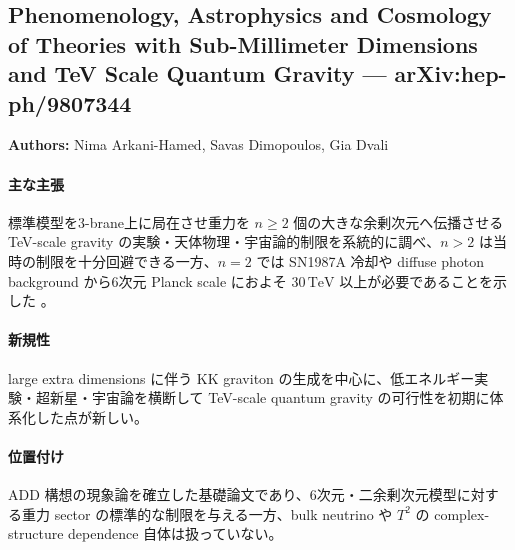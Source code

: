 \subsection{Phenomenology, Astrophysics and Cosmology of Theories with Sub-Millimeter Dimensions and TeV Scale Quantum Gravity --- arXiv:hep-ph/9807344}

\textbf{Authors:} Nima Arkani-Hamed, Savas Dimopoulos, Gia Dvali

\paragraph{主な主張}
標準模型を3-brane上に局在させ重力を $n\geq2$ 個の大きな余剰次元へ伝播させる TeV-scale gravity の実験・天体物理・宇宙論的制限を系統的に調べ、$n>2$ は当時の制限を十分回避できる一方、$n=2$ では SN1987A 冷却や diffuse photon background から6次元 Planck scale におよそ $30\,\mathrm{TeV}$ 以上が必要であることを示した \cite{ArkaniHamed:1998ADDpheno}。

\paragraph{新規性}
large extra dimensions に伴う KK graviton の生成を中心に、低エネルギー実験・超新星・宇宙論を横断して TeV-scale quantum gravity の可行性を初期に体系化した点が新しい。

\paragraph{位置付け}
ADD 構想の現象論を確立した基礎論文であり、6次元・二余剰次元模型に対する重力 sector の標準的な制限を与える一方、bulk neutrino や $T^2$ の complex-structure dependence 自体は扱っていない。
